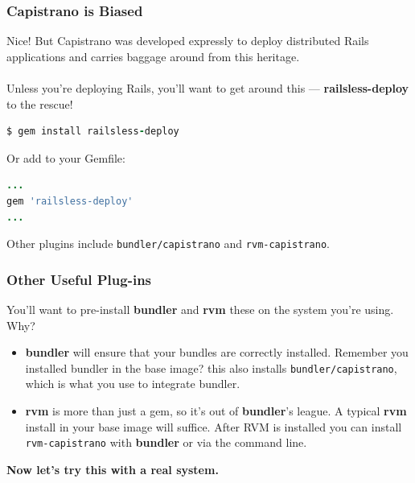 \documentclass[t,handout]{beamer}
\begin{document}
\begin{frame}[fragile]
\frametitle{Capistrano is Biased}
Nice! But Capistrano was developed expressly to deploy distributed Rails applications and carries baggage around from this heritage.\\~\\

Unless you're deploying Rails, you'll want to get around this --- {\bf railsless-deploy} to the rescue!
\begin{lstlisting}[frame=none,language=Ruby,basicstyle=\scriptsize\ttfamily\color{black},commentstyle=\tiny\ttfamily\color{red}]
$ gem install railsless-deploy
\end{lstlisting}
Or add to your Gemfile:
\begin{lstlisting}[frame=none,language=Ruby,basicstyle=\scriptsize\ttfamily\color{black},commentstyle=\tiny\ttfamily\color{red}]
...
gem 'railsless-deploy'
...
\end{lstlisting}
Other plugins include {\small\tt bundler/capistrano} and {\small\tt rvm-capistrano}.
\end{frame}

\begin{frame}
\frametitle{Other Useful Plug-ins}
You'll want to pre-install {\bf bundler} and {\bf rvm} these on the system you're using. Why?
\begin{small}
\begin{itemize}
\item {\bf bundler} will ensure that your bundles are correctly installed.  Remember you installed bundler in the base image? this also installs {\small\tt bundler/capistrano}, which is what you use to integrate bundler.
\item {\bf rvm} is more than just a gem, so it's out of {\bf bundler}'s league.  A typical {\bf rvm} install in your base image will suffice.  After RVM is installed you can install {\small\tt rvm-capistrano} with {\bf bundler} or via the command line.
\end{itemize}
\end{small}
\begin{center}
{\bf Now let's try this with a real system.}
\end{center}
\end{frame}
\end{document}
